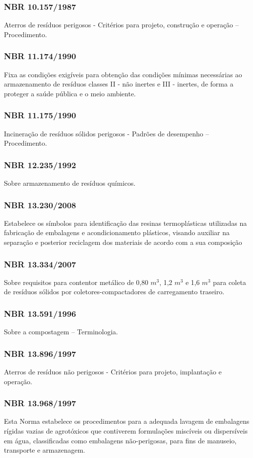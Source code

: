 \begin{subapend}
\begin{subsubapend}
		\subsubsection{NBR 10.157/1987}
		Aterros de resíduos perigosos - Critérios para projeto, construção e operação – Procedimento.
		\subsubsection{NBR 11.174/1990}
		Fixa as condições exigíveis para obtenção das condições mínimas necessárias ao armazenamento de resíduos classes II - não inertes e III - inertes, de forma a proteger a saúde pública e o meio ambiente.
		\subsubsection{NBR 11.175/1990}
		Incineração de resíduos sólidos perigosos - Padrões de desempenho – Procedimento.
		\subsubsection{NBR 12.235/1992}
		Sobre armazenamento de resíduos químicos.
		\subsubsection{NBR 13.230/2008}
		Estabelece os símbolos para identificação das resinas termoplásticas utilizadas na fabricação de embalagens e acondicionamento plásticos, visando auxiliar na separação e posterior reciclagem dos materiais de acordo com a sua composição
		\subsubsection{NBR 13.334/2007}
		Sobre requisitos para contentor metálico de 0,80 $m^3$, 1,2 $m^3$ e 1,6 $m^3$ para coleta de resíduos sólidos por coletores-compactadores de carregamento traseiro.
		\subsubsection{NBR 13.591/1996}
		Sobre a compostagem – Terminologia.
		\subsubsection{NBR 13.896/1997}
		Aterros de resíduos não perigosos - Critérios para projeto, implantação e operação.
		\subsubsection{NBR 13.968/1997}
		Esta Norma estabelece os procedimentos para a adequada lavagem de embalagens rígidas vazias de agrotóxicos que contiverem formulações miscíveis ou dispersíveis em água, classificadas como embalagens não-perigosas, para fins de manuseio, transporte e armazenagem.

\end{subsubapend}
\end{subapend}
